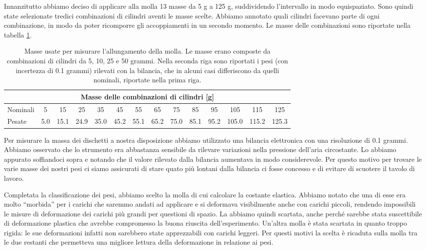 Innanzitutto abbiamo deciso di applicare alla molla 13 masse da 5 g a 125 g, suddividendo l'intervallo in modo equispaziato.
Sono quindi state selezionate tredici combinazioni di cilindri aventi le masse scelte.
Abbiamo annotato quali cilindri facevano parte di ogni combinazione, in modo da poter ricomporre gli accoppiamenti in un secondo momento. Le masse delle combinazioni sono riportate nella tabella \ref{tab:masse}.

\begin{table}[tb]
    \centering
    \small
    \begin{tabular}{l | c c c c c c c c c c c c c}
        \multicolumn{14}{c}{\textbf{Masse delle combinazioni di cilindri [g]}} \\[1mm]
        \toprule
        Nominali & 5 & 15 & 25 & 35 & 45 & 55 & 65 & 75 & 85 & 95 & 105 & 115 & 125 \\
        Pesate & 5.0 & 15.1 & 24.9 & 35.0 & 45.2 & 55.1 & 65.2 & 75.0 & 85.1 & 95.2 & 105.0 & 115.2 & 125.3 \\
        \bottomrule
    \end{tabular}
    \caption{Masse usate per misurare l'allungamento della molla. Le masse erano composte da combinazioni
    di cilindri da 5, 10, 25 e 50 grammi. Nella seconda riga sono riportati i pesi (con incertezza di 0.1 grammi) rilevati con
    la bilancia, che in alcuni casi differiscono da quelli nominali, riportate nella prima riga.}
    \label{tab:masse}
\end{table}

Per misurare la massa dei dischetti a nostra disposizione abbiamo utilizzato una bilancia elettronica con una risoluzione di 0.1 grammi. Abbiamo osservato che lo strumento era abbastanza sensibile da rilevare variazioni nella pressione dell'aria circostante. Lo abbiamo appurato soffiandoci sopra e notando che il valore rilevato dalla bilancia aumentava in modo considerevole. Per questo motivo per trovare le varie masse dei nostri pesi ci siamo assicurati di stare quato più lontani dalla bilancia ci fosse concesso e di evitare di scuotere il tavolo di lavoro.

Completata la classificazione dei pesi, abbiamo scelto la molla di cui calcolare la
costante elastica. Abbiamo notato che una di esse era molto ``morbida'' per i carichi che saremmo
andati ad applicare e si deformava visibilmente anche con carichi piccoli, rendendo impossibili
le misure di deformazione dei carichi più grandi per questioni di spazio.
La abbiamo quindi scartata, anche perché sarebbe stata suscettibile di deformazione
plastica che avrebbe compromesso la buona riuscita dell'esperimento.
Un'altra molla è stata scartata in quanto troppo rigida: le sue deformazioni infatti non sarebbero state apprezzabili con carichi leggeri. Per questi motivi la scelta è ricaduta sulla molla tra 
le due restanti che permetteva una migliore lettura della deformazione in relazione ai pesi.

